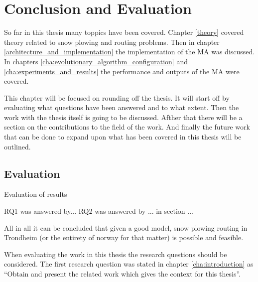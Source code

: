 \chapter{Conclusion and Evaluation}

So far in this thesis many toppics have been covered. Chapter \ref{theory} covered theory related to snow plowing and routing problems. Then in chapter \ref{architecture_and_implementation} the implementation of the MA was discussed. In chapters \ref{cha:evolutionary_algorithm_configuration} and \ref{cha:experiments_and_results} the performance and outputs of the MA were covered.

This chapter will be focused on rounding off the thesis. It will start off by evaluating what questions have been answered and to what extent. Then the work with the thesis itself is going to be discussed. Afther that there will be a section on the contributions to the field of the work. And finally the future work that can be done to expand upon what has been covered in this thesis will be outlined.

\section{Evaluation}
Evaluation of results

RQ1 was answered by...
RQ2 was answered by ... in section ...

All in all it can be concluded that given a good model, snow plowing routing in Trondheim (or the entirety of norway for that matter) is possible and feasible.


When evaluating the work in this thesis the research questions should be considered. The first research question was stated in chapter \ref{cha:introduction} as \enquote{Obtain and present the related work which gives the context for this thesis}.


